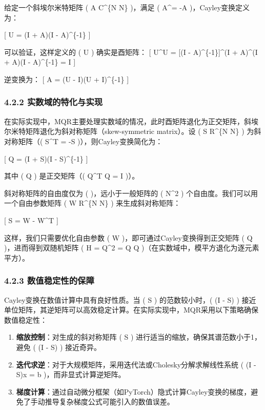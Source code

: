 \documentclass[
  12pt,
]{article}
\begin{document}
给定一个斜埃尔米特矩阵 ( A \in C\^{}\{N \times N\} )，满足 (
A\^{}\dagger = -A )，Cayley变换定义为：

{[} U = (I + A)(I - A)\^{}\{-1\} {]}

可以验证，这样定义的 ( U ) 确实是酉矩阵： {[} U\^{}\dagger U = {[}(I -
A)\^{}\{-1\}{]}\^{}\dagger (I + A)\^{}\dagger (I + A)(I - A)\^{}\{-1\} =
I {]}

逆变换为： {[} A = (U - I)(U + I)\^{}\{-1\} {]}

\hypertarget{ux5b9eux6570ux57dfux7684ux7279ux5316ux4e0eux5b9eux73b0}{%
\subsubsection{4.2.2
实数域的特化与实现}\label{ux5b9eux6570ux57dfux7684ux7279ux5316ux4e0eux5b9eux73b0}}

在实际实现中，MQR主要处理实数域的情况，此时酉矩阵退化为正交矩阵，斜埃尔米特矩阵退化为斜对称矩阵（skew-symmetric
matrix）。设 ( S \in R\^{}\{N \times N\} ) 为斜对称矩阵（(
S\^{}T = -S )），则Cayley变换简化为：

{[} Q = (I + S)(I - S)\^{}\{-1\} {]}

其中 ( Q ) 是正交矩阵（( Q\^{}T Q = I )）。

斜对称矩阵的自由度仅为 (  )，远小于一般矩阵的 ( N\^{}2 )
个自由度。我们可以用一个自由参数矩阵 ( W \in R\^{}\{N
\times N\} ) 来生成斜对称矩阵：

{[} S = W - W\^{}T {]}

这样，我们只需要优化自由参数 ( W )，即可通过Cayley变换得到正交矩阵 ( Q
)，进而得到双随机矩阵 ( H = \textbar Q\textbar\^{}2 = Q \odot Q
)（在实数域中，模平方退化为逐元素平方）。

\hypertarget{ux6570ux503cux7a33ux5b9aux6027ux7684ux4fddux969c}{%
\subsubsection{4.2.3
数值稳定性的保障}\label{ux6570ux503cux7a33ux5b9aux6027ux7684ux4fddux969c}}

Cayley变换在数值计算中具有良好性质。当 ( S ) 的范数较小时，( (I - S) )
接近单位矩阵，其逆矩阵可以高效稳定计算。在实际实现中，MQR采用以下策略确保数值稳定性：

\begin{enumerate}
\def\labelenumi{\arabic{enumi}.}
\item
  \textbf{缩放控制}：对生成的斜对称矩阵 ( S )
  进行适当的缩放，确保其谱范数小于1，避免 ( (I - S) ) 接近奇异。
\item
  \textbf{迭代求逆}：对于大规模矩阵，采用迭代法或Cholesky分解求解线性系统
  ( (I - S)x = b )，而非显式计算逆矩阵。
\item
  \textbf{梯度计算}：通过自动微分框架（如PyTorch）隐式计算Cayley变换的梯度，避免了手动推导复杂梯度公式可能引入的数值误差。
\end{enumerate}
\end{document}
